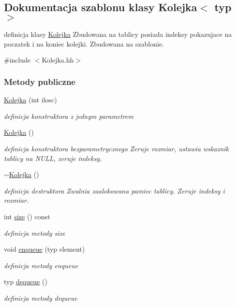 \hypertarget{class_kolejka}{}\subsection{Dokumentacja szablonu klasy Kolejka$<$ typ $>$}
\label{class_kolejka}


definicja klasy \hyperlink{class_kolejka}{Kolejka} Zbudowana na tablicy posiada indeksy pokazujace na poczatek i na koniec kolejki. Zbudowana na szablonie.  




{\ttfamily \#include $<$Kolejka.\+hh$>$}

\subsubsection*{Metody publiczne}
\begin{DoxyCompactItemize}
\item 
\hyperlink{class_kolejka_a9e3a347692b91c7c805dbc4c600d3611}{Kolejka} (int ilosc)
\begin{DoxyCompactList}\small\item\em definicja konstruktora z jednym parametrem \end{DoxyCompactList}\item 
\hyperlink{class_kolejka_ae64d506b36a27fdf2c66e53aaa7ae79d}{Kolejka} ()
\begin{DoxyCompactList}\small\item\em definicja konstruktora bezparametrycznego Zeruje rozmiar, ustawia wskaznik tablicy na N\+U\+L\+L, zeruje indeksy. \end{DoxyCompactList}\item 
\hyperlink{class_kolejka_a19d3261c05d90a58feed8340ea995258}{$\sim$\+Kolejka} ()
\begin{DoxyCompactList}\small\item\em definicja destruktora Zwalnia zaalokowana pamiec tablicy. Zeruje indeksy i rozmiar. \end{DoxyCompactList}\item 
int \hyperlink{class_kolejka_a487b41717feb173ed0cac156d143a7f9}{size} () const 
\begin{DoxyCompactList}\small\item\em definicja metody size \end{DoxyCompactList}\item 
void \hyperlink{class_kolejka_a8cf2fbf3b641c1914d63580ce59ec3ef}{enqueue} (typ element)
\begin{DoxyCompactList}\small\item\em definicja metody enqueue \end{DoxyCompactList}\item 
typ \hyperlink{class_kolejka_a7473ad1afce6acba353bfdd78f7c72e0}{dequeue} ()
\begin{DoxyCompactList}\small\item\em definicja metody dequeue \end{DoxyCompactList}\end{DoxyCompactItemize}
